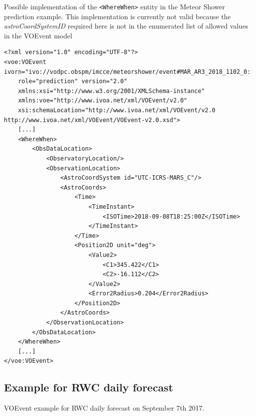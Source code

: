 \documentclass[referee,a4paper,12pt,traditabstract]{swsc}
\begin{document}
\begin{linenumbers}
Possible implementation of the {\tt <WhereWhen>} entity in the Meteor Shower prediction example. This implementation is currently not valid because the \emph{astroCoordSystemID} required here is not in the enumerated list of allowed values in the VOEvent model

{\tiny 
\begin{verbatim}
<?xml version="1.0" encoding="UTF-8"?>
<voe:VOEvent ivorn="ivo://vodpc.obspm/imcce/meteorshower/event#MAR_AR3_2018_1102_0::v1.0"
    role="prediction" version="2.0"
    xmlns:xsi="http://www.w3.org/2001/XMLSchema-instance"
    xmlns:voe="http://www.ivoa.net/xml/VOEvent/v2.0"
    xsi:schemaLocation="http://www.ivoa.net/xml/VOEvent/v2.0 http://www.ivoa.net/xml/VOEvent/VOEvent-v2.0.xsd">
    [...]
    <WhereWhen>
        <ObsDataLocation>
            <ObservatoryLocation/>
            <ObservationLocation>
                <AstroCoordSystem id="UTC-ICRS-MARS_C"/>
                <AstroCoords>
                    <Time>
                        <TimeInstant>
                            <ISOTime>2018-09-08T18:25:00Z</ISOTime>
                        </TimeInstant>
                    </Time>
                    <Position2D unit="deg">
                        <Value2>
                            <C1>345.422</C1>
                            <C2>-16.112</C2>
                        </Value2>
                        <Error2Radius>0.204</Error2Radius>
                    </Position2D>
                </AstroCoords>
            </ObservationLocation>
        </ObsDataLocation>
    </WhereWhen>
    [...]
</voe:VOEvent>
\end{verbatim}
}

\subsection{Example for RWC daily forecast}
\label{appendix-xml-voevent-rwc}

VOEvent example for RWC daily forecast on September 7th 2017.


\end{linenumbers}
\end{document}
